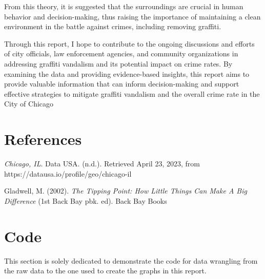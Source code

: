 \documentclass[
]{report}
\begin{document}
From this theory, it is suggested that the surroundings are crucial in
human behavior and decision-making, thus raising the importance of
maintaining a clean environment in the battle against crimes, including
removing graffiti.

Through this report, I hope to contribute to the ongoing discussions and
efforts of city officials, law enforcement agencies, and community
organizations in addressing graffiti vandalism and its potential impact
on crime rates. By examining the data and providing evidence-based
insights, this report aims to provide valuable information that can
inform decision-making and support effective strategies to mitigate
graffiti vandalism and the overall crime rate in the City of Chicago

\hypertarget{references}{%
\section{References}\label{references}}

\emph{Chicago, IL}. Data USA. (n.d.). Retrieved April 23, 2023, from
https://datausa.io/profile/geo/chicago-il

Gladwell, M. (2002). \emph{The Tipping Point: How Little Things Can Make
A Big Difference} (1st Back Bay pbk. ed). Back Bay Books

\hypertarget{code}{%
\section{Code}\label{code}}

This section is solely dedicated to demonstrate the code for data
wrangling from the raw data to the one used to create the graphs in this
report.
\end{document}
